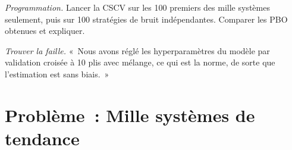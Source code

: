 \begin{exercise}[$\star\star\star$]\label{exo:rs:overfitting:7}
\emph{Programmation.} Lancer la CSCV sur les 100 premiers des mille systèmes seulement, puis sur 100 stratégies de bruit indépendantes. Comparer les PBO obtenues et expliquer.
\end{exercise}

\begin{exercise}[$\star\star\star$]\label{exo:rs:overfitting:8}
\emph{Trouver la faille.} «~Nous avons réglé les hyperparamètres du modèle par validation croisée à 10 plis avec mélange, ce qui est la norme, de sorte que l'estimation  est
sans biais.~»
\end{exercise}

\section{Problème~: Mille systèmes de tendance}

